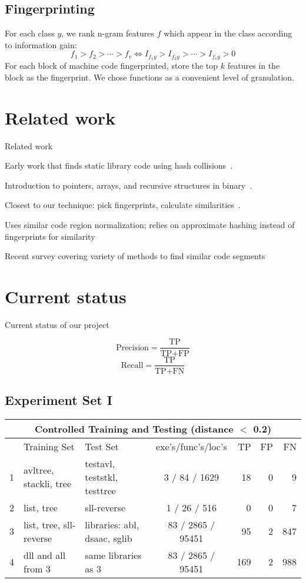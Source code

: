 \documentclass[12pt]{article}
\begin{document}
\subsection*{Fingerprinting}

For each class $y$, we rank n-gram features $f$ which appear in the
class according to information gain:
\[ f_1 > f_2 > \cdots > f_v \Leftrightarrow I_{f_1 y} > I_{f_2 y} > \cdots > I_{f_v y} > 0 \]
For each block of machine code fingerprinted, store the top $k$
features in the block as the fingerprint.  We chose functions as a
convenient level of granulation.

\section{Related work}

Related work

Early work that finds static library code using hash collisions~\cite{1998-Emmerik-ASWEC}.

Introduction to pointers, arrays, and recursive structures in binary~\cite{1999-Mycroft-ESOP}.

Closest to our technique: pick fingerprints, calculate similarities~\cite{2009-Smith-IWSC}.

Uses similar code region normalization; relies on approximate hashing instead of fingerprints for similarity~\cite{2009-Saebjoernsen-ISSTA}

Recent survey covering variety of methods to find similar code segments~\cite{2009-Roy}

\section{Current status}

Current status of our project

\[ \text{Precision} = \frac{ \text{TP} }{ \text{TP} + \text{FP} } \]
\[ \text{Recall}    = \frac{ \text{TP} }{ \text{TP} + \text{FN} } \]

\subsection*{Experiment Set I}

\hspace{-0.6in}
\begin{tabular}{|l|l|l|c|r|r|r|}
\hline
\multicolumn{7}{|c|}{Controlled Training and Testing  (distance $<$ 0.2)} \\
\hline
  & Training Set            & Test Set                     & exe's/func's/loc's &  TP & FP &  FN \\
\hline
1 & avltree, stackli, tree  & testavl, teststkl, testtree  &  3 /   84 /  1629  &  18 &  0 &   9 \\
2 & list, tree              & sll-reverse                  &  1 /   26 /   516  &   0 &  0 &   7 \\
3 & list, tree, sll-reverse & libraries: abl, dsaac, sglib & 83 / 2865 / 95451  &  95 &  2 & 847 \\
4 & dll and all from 3      & same libraries as 3          & 83 / 2865 / 95451  & 169 &  2 & 988 \\
\hline
\end{tabular}
\end{document}
